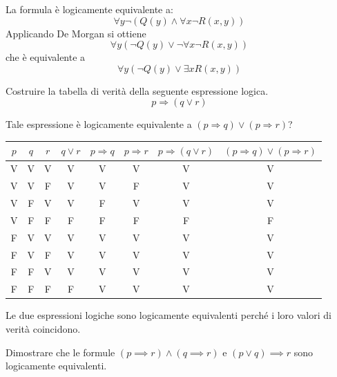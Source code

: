 \begin{soluzione}
La formula è logicamente equivalente a:
$$\forall y \neg (Q(y) \land \forall x \neg R(x,y))$$
Applicando De Morgan si ottiene
$$\forall y (\neg Q(y) \lor \neg\forall x \neg R(x,y))$$
che è equivalente a
$$\forall y (\neg Q(y) \lor \exists x R(x,y))$$
\end{soluzione}


\begin{esercizio}
    
Costruire la tabella di verità della seguente espressione logica.
$$p \Rightarrow (q \vee r)$$

Tale espressione è logicamente equivalente a $(p \Rightarrow q) \vee (p \Rightarrow r)$? \newline
\end{esercizio}

\begin{soluzione}	
\begin{center}
    \begin{tabular}{| c | c | c || c | c | c || c | c |}
        \hline
        $p$ & $q$ & $r$ & $q \vee r$ & $p \Rightarrow q$ & $p \Rightarrow r$ & $p \Rightarrow (q \vee r)$ & $(p \Rightarrow q) \vee (p \Rightarrow r)$  \\
        \hline 
        V &V &V &V &V &V &V &V \\ \hline
        V &V &F &V &V &F &V &V \\ \hline
        V &F &V &V &F &V &V &V \\ \hline
        V &F &F &F &F &F &F &F \\ \hline
        F &V &V &V &V &V &V &V \\ \hline
        F &V &F &V &V &V &V &V \\ \hline
        F &F &V &V &V &V &V &V \\ \hline
        F &F &F &F &V &V &V &V \\ \hline
    \end{tabular}
\end{center}

Le due espressioni logiche sono logicamente equivalenti perché i loro valori di verità coincidono.\\
\end{soluzione}


\begin{esercizio}
Dimostrare che le formule $(p\implies r)\land(q \implies r)$ e $(p\lor q)\implies r$ sono logicamente equivalenti.
\end{esercizio}

